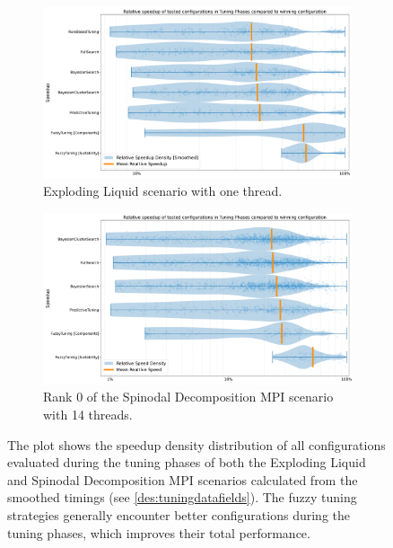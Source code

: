 \begin{figure}[H]
    \centering

    \begin{subfigure}[c]{\textwidth}
        \includegraphics[width=\columnwidth,trim={1cm 0 0cm 1cm},clip]{figures/Benchmark/Observations/tuning_phase_speedup_explodingLiquid_1_zoomed.png}
        \caption{Exploding Liquid scenario with one thread.}
        \label{fig:explodingLiquidSpeedupDensity}
    \end{subfigure}


    \begin{subfigure}[c]{\textwidth}
        \includegraphics[width=\columnwidth,trim={1cm 0 0cm 1cm},clip]{figures/Benchmark/Observations/tuning_phase_speedup_SpinodalDecompositionMPI_14_0.png}
        \caption{Rank 0 of the Spinodal Decomposition MPI scenario with 14 threads.}
        \label{fig:spinodalSpeedupDensity}
    \end{subfigure}


    \caption[Quality of predictions during tuning phases]{The plot shows the speedup density distribution of all configurations evaluated during the tuning phases of both the Exploding Liquid and Spinodal Decomposition MPI scenarios calculated from the smoothed timings (see \autoref*{des:tuningdatafields}). The fuzzy tuning strategies generally encounter better configurations during the tuning phases, which improves their total performance.}
    \label{fig:tuningPhaseSpeedup}
\end{figure}

